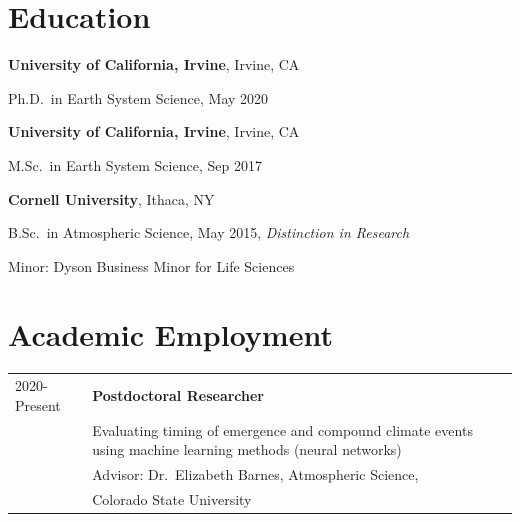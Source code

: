 \documentclass[margin,line,palatino,courier,10pt]{res}
\newenvironment{list1}{
  \begin{list}{\ding{113}}{%
      \setlength{\itemsep}{0in}
      \setlength{\parsep}{0in} \setlength{\parskip}{0in}
      \setlength{\topsep}{0in} \setlength{\partopsep}{0in}
      \setlength{\leftmargin}{0.17in}}}{\end{list}}
\begin{document}
\begin{resume}
\section{\sc \large{\textcolor{Cerulean}{\textbf{Education}}}}

{\bf University of California, Irvine}, Irvine, CA\\
\vspace*{-.12in}
\begin{list1}
\item[] Ph.D.~in Earth System Science, May 2020
\end{list1}

{\bf University of California, Irvine}, Irvine, CA\\
\vspace*{-.12in}
\begin{list1}
\item[] M.Sc.~in Earth System Science, Sep 2017
\end{list1}

{\bf Cornell University}, Ithaca, NY\\
\vspace*{-.12in}
\begin{list1}
\item[] B.Sc.~in Atmospheric Science, May 2015, \textit{Distinction in Research}

\hspace*{0.2in}  Minor: Dyson Business Minor for Life Sciences

\end{list1}

\section{\sc \textcolor{Cerulean}{\large{\textbf{Academic Employment}}}}
\vspace*{0.05in}
\begin{tabular}{@{}p{0.9in}p{4in}}
2020-Present & \textbf{Postdoctoral Researcher}\\
& Evaluating timing of emergence and compound climate events using machine learning methods (neural networks)\\
& \hspace{0.2in} Advisor: Dr.\ Elizabeth Barnes, Atmospheric Science,\\
& \vspace{-0.18in}\hspace{0.2in} Colorado State University\\


\end{tabular}
\end{resume}
\end{document}
